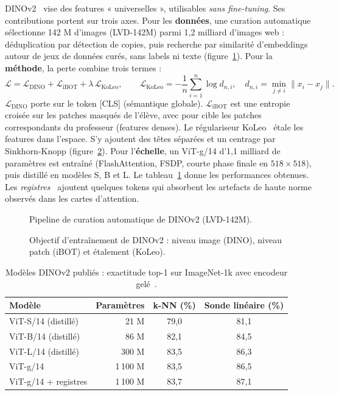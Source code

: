 \documentclass[11pt,a4paper]{article}
\begin{document}
DINOv2~\citep{oquab2024dinov2} vise des features « universelles », utilisables \emph{sans fine-tuning}. Ses contributions portent sur trois axes. Pour les \textbf{données}, une curation automatique sélectionne 142 M d'images (LVD-142M) parmi 1,2 milliard d'images web : déduplication par détection de copies, puis recherche par similarité d'embeddings autour de jeux de données curés, sans labels ni texte (figure~\ref{fig:curation}). Pour la \textbf{méthode}, la perte combine trois termes :
\begin{equation}
  \mathcal{L}=\mathcal{L}_{\text{DINO}}+\mathcal{L}_{\text{iBOT}}+\lambda\,\mathcal{L}_{\text{KoLeo}},\qquad \mathcal{L}_{\text{KoLeo}}=-\frac{1}{n}\sum_{i=1}^{n}\log d_{n,i},\quad d_{n,i}=\min_{j\neq i}\|x_i-x_j\| .
\end{equation}
$\mathcal{L}_{\text{DINO}}$ porte sur le token [CLS] (sémantique globale). $\mathcal{L}_{\text{iBOT}}$ est une entropie croisée sur les patches masqués de l'élève, avec pour cible les patches correspondants du professeur (features denses). Le régulariseur KoLeo~\citep{sablayrolles2019koleo} étale les features dans l'espace. S'y ajoutent des têtes séparées et un centrage par Sinkhorn-Knopp (figure~\ref{fig:dinov2obj}). Pour l'\textbf{échelle}, un ViT-g/14 d'1,1 milliard de paramètres est entraîné (FlashAttention, FSDP, courte phase finale en $518\times518$), puis distillé en modèles S, B et L. Le tableau~\ref{tab:dinov2} donne les performances obtenues. Les \emph{registres}~\citep{darcet2024registers} ajoutent quelques tokens qui absorbent les artefacts de haute norme observés dans les cartes d'attention.

\begin{figure}[ht]
  \centering
  \resizebox{0.78\textwidth}{!}{}
  \caption{Pipeline de curation automatique de DINOv2 (LVD-142M).}
  \label{fig:curation}
\end{figure}
\begin{figure}[ht]
  \centering
  \resizebox{0.78\textwidth}{!}{}
  \caption{Objectif d'entraînement de DINOv2 : niveau image (DINO), niveau patch (iBOT) et étalement (KoLeo).}
  \label{fig:dinov2obj}
\end{figure}

\begin{table}[ht]
  \centering\small
  \caption{Modèles DINOv2 publiés : exactitude top-1 sur ImageNet-1k avec encodeur gelé~\citep{dinov2github}.}
  \label{tab:dinov2}
  \begin{tabular}{l r c c}
    \toprule
    Modèle & Paramètres & k-NN (\%) & Sonde linéaire (\%)\\
    \midrule
    ViT-S/14 (distillé) & 21 M & 79,0 & 81,1\\
    ViT-B/14 (distillé) & 86 M & 82,1 & 84,5\\
    ViT-L/14 (distillé) & 300 M & 83,5 & 86,3\\
    ViT-g/14 & 1\,100 M & 83,5 & 86,5\\
    ViT-g/14 + registres & 1\,100 M & 83,7 & 87,1\\
    \bottomrule
  \end{tabular}
\end{table}
\end{document}
